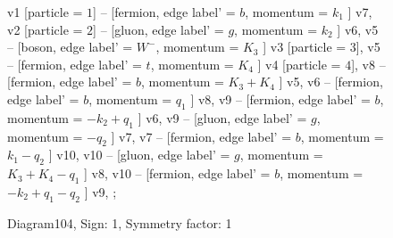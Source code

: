 \documentclass{revtex4}
\begin{document}
\begin{figure}[!htb]
\begin{center}
{    %
v1 [particle = \(1\)] -- [fermion, edge label' = \(b\), momentum = \(k_{1}\) ] v7, 
v2 [particle = \(2\)] -- [gluon, edge label' = \(g\), momentum = \(k_{2}\) ] v6, 
v5 -- [boson, edge label' = \(W^{-}\), momentum = \(K_{3}\) ] v3 [particle = \(3\)], 
v5 -- [fermion, edge label' = \(t\), momentum = \(K_{4}\) ] v4 [particle = \(4\)], 
v8 -- [fermion, edge label' = \(b\), momentum = \(K_{3} + K_{4}\) ] v5, 
v6 -- [fermion, edge label' = \(b\), momentum = \(q_{1}\) ] v8, 
v9 -- [fermion, edge label' = \(b\), momentum = \(-k_{2} + q_{1}\) ] v6, 
v9 -- [gluon, edge label' = \(g\), momentum = \(-q_{2}\) ] v7, 
v7 -- [fermion, edge label' = \(b\), momentum = \(k_{1} - q_{2}\) ] v10, 
v10 -- [gluon, edge label' = \(g\), momentum = \(K_{3} + K_{4} - q_{1}\) ] v8, 
v10 -- [fermion, edge label' = \(b\), momentum = \(-k_{2} + q_{1} - q_{2}\) ] v9, 
};
\end{center}
\caption{Diagram104, Sign: 1, Symmetry factor: 1}
\end{figure}
\newpage
\end{document}
